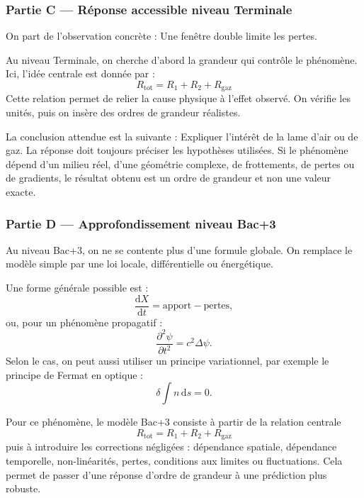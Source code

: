 \documentclass[11pt,a4paper]{article}
\begin{document}
\subsubsection*{Partie C — Réponse accessible niveau Terminale}

\begin{corrigebox}
On part de l'observation concrète : Une fenêtre double limite les pertes.

Au niveau Terminale, on cherche d'abord la grandeur qui contrôle le phénomène. Ici, l'idée centrale est donnée par :
\[
R_{\mathrm{tot}}=R_1+R_2+R_{\mathrm{gaz}}
\]
Cette relation permet de relier la cause physique à l'effet observé. On vérifie les unités, puis on insère des ordres de grandeur réalistes.

La conclusion attendue est la suivante : Expliquer l'intérêt de la lame d'air ou de gaz. La réponse doit toujours préciser les hypothèses utilisées. Si le phénomène dépend d'un milieu réel, d'une géométrie complexe, de frottements, de pertes ou de gradients, le résultat obtenu est un ordre de grandeur et non une valeur exacte.
\end{corrigebox}

\subsubsection*{Partie D — Approfondissement niveau Bac+3}

\begin{approfondissementbox}
Au niveau Bac+3, on ne se contente plus d'une formule globale. On remplace le modèle simple par une loi locale, différentielle ou énergétique.

Une forme générale possible est :
\[
\frac{\mathrm d X}{\mathrm dt}=\text{apport}-\text{pertes},
\]
ou, pour un phénomène propagatif :
\[
\frac{\partial^2 \psi}{\partial t^2}=c^2\Delta\psi.
\]
Selon le cas, on peut aussi utiliser un principe variationnel, par exemple le principe de Fermat en optique :
\[
\delta \int n\,\mathrm ds=0.
\]

Pour ce phénomène, le modèle Bac+3 consiste à partir de la relation centrale
\[
R_{\mathrm{tot}}=R_1+R_2+R_{\mathrm{gaz}}
\]
puis à introduire les corrections négligées : dépendance spatiale, dépendance temporelle, non-linéarités, pertes, conditions aux limites ou fluctuations. Cela permet de passer d'une réponse d'ordre de grandeur à une prédiction plus robuste.
\end{approfondissementbox}
\end{document}
